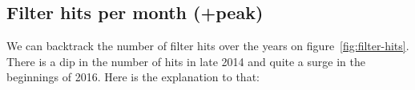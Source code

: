 
\subsection{Filter hits per month (+peak)}
We can backtrack the number of filter hits over the years on figure~\ref{fig:filter-hits}.
There is a dip in the number of hits in late 2014 and quite a surge in the beginnings of 2016.
Here is the explanation to that:

